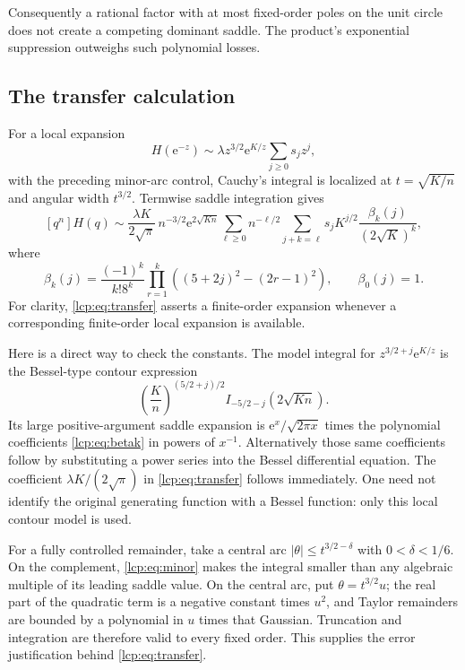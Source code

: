 \documentclass[11pt]{article}
\numberwithin{equation}{section}
\theoremstyle{definition}\newtheorem{definition}[theorem]{Definition}
\theoremstyle{remark}\newtheorem{remark}[theorem]{Remark}
\newcommand{\ee}{\mathrm e}
\begin{document}
Consequently a rational factor with at most fixed-order poles on the
unit circle does not create a competing dominant saddle. The product's
exponential suppression outweighs such polynomial losses.

\subsection{The transfer calculation}
For a local expansion
\[
 H(\ee^{-z})\sim\lambda z^{3/2}\ee^{K/z}
                 \sum_{j\ge0}s_jz^j,
\]
with the preceding minor-arc control, Cauchy's integral is localized at
$t=\sqrt{K/n}$ and angular width $t^{3/2}$.
Termwise saddle integration gives
\begin{equation}\label{lcp:eq:transfer}
 [q^n]H(q)\sim
 \frac{\lambda K}{2\sqrt\pi}\,n^{-3/2}\ee^{2\sqrt{Kn}}
 \sum_{\ell\ge0}n^{-\ell/2}
 \sum_{j+k=\ell}s_jK^{j/2}
       \frac{\beta_k(j)}{(2\sqrt K)^k},
\end{equation}
where
\begin{equation}\label{lcp:eq:betak}
 \beta_k(j)=\frac{(-1)^k}{k!8^k}
 \prod_{r=1}^k\left((5+2j)^2-(2r-1)^2\right),\qquad
 \beta_0(j)=1.
\end{equation}
For clarity, \eqref{lcp:eq:transfer} asserts a finite-order expansion whenever
a corresponding finite-order local expansion is available.

Here is a direct way to check the constants. The model integral for
$z^{3/2+j}\ee^{K/z}$ is the Bessel-type contour expression
\[
 \left(\frac Kn\right)^{(5/2+j)/2}
 I_{-5/2-j}(2\sqrt{Kn}).
\]
Its large positive-argument saddle expansion is
$\ee^x/\sqrt{2\pi x}$ times the polynomial coefficients
\eqref{lcp:eq:betak} in powers of $x^{-1}$. Alternatively those same
coefficients follow by substituting a power series into the Bessel
differential equation. The coefficient $\lambda K/(2\sqrt\pi)$ in
\eqref{lcp:eq:transfer} follows immediately.
One need not identify the original generating function with a Bessel
function: only this local contour model is used.

For a fully controlled remainder, take a central arc
$|\theta|\le t^{3/2-\delta}$ with $0<\delta<1/6$.
On the complement, \eqref{lcp:eq:minor} makes the integral smaller than
any algebraic multiple of its leading saddle value. On the central arc,
put $\theta=t^{3/2}u$; the real part of the quadratic term is a negative
constant times $u^2$, and Taylor remainders are bounded by a polynomial
in $u$ times that Gaussian. Truncation and integration are therefore
valid to every fixed order. This supplies the error justification
behind \eqref{lcp:eq:transfer}.
\end{document}
